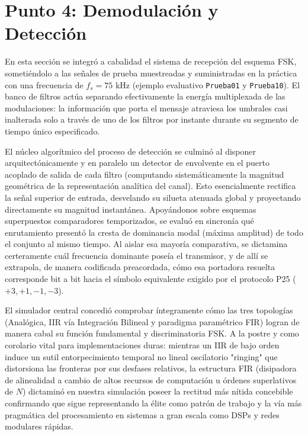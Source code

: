 \documentclass[9pt,a4paper,oneside]{rho-class/rho}
\begin{document}
\section{Punto 4: Demodulación y Detección}

    En esta sección se integró a cabalidad el sistema de recepción del esquema FSK, sometiéndolo a las señales de prueba muestreadas y suministradas en la práctica con una frecuencia de $f_s = 75$ kHz (ejemplo evaluativo \texttt{Prueba01} y \texttt{Prueba10}). El banco de filtros actúa separando efectivamente la energía multiplexada de las modulaciones: la información que porta el mensaje atraviesa los umbrales casi inalterada solo a través de uno de los filtros por instante durante su segmento de tiempo único especificado.
    
    El núcleo algorítmico del proceso de detección se culminó al disponer arquitectónicamente y en paralelo un detector de envolvente en el puerto acoplado de salida de cada filtro (computando sistemáticamente la magnitud geométrica de la representación analítica del canal). Esto esencialmente rectifica la señal superior de entrada, desvelando su silueta atenuada global y proyectando directamente su magnitud instantánea. Apoyándonos sobre esquemas superpuestos comparadores temporizados, se evaluó en sincronía qué enrutamiento presentó la cresta de dominancia modal (máxima amplitud) de todo el conjunto al mismo tiempo. Al aislar esa mayoría comparativa, se dictamina certeramente cuál frecuencia dominante poseía el transmisor, y de allí se extrapola, de manera codificada preacordada, cómo esa portadora resuelta corresponde bit a bit hacia el símbolo equivalente exigido por el protocolo P25 ($+3, +1, -1, -3$).
    
    El simulador central concedió comprobar íntegramente cómo las tres topologías (Analógica, IIR vía Integración Bilineal y paradigma paramétrico FIR) logran de manera cabal su función fundamental y discriminatoria FSK. A la postre y como corolario vital para implementaciones duras: mientras un IIR de bajo orden induce un sutil entorpecimiento temporal no lineal oscilatorio "ringing" que distorsiona las fronteras por sus desfases relativos, la estructura FIR (disipadora de alinealidad a cambio de altos recursos de computación u órdenes superlativos de $N$) dictaminó en nuestra simulación poseer la rectitud más nítida concebible confirmando que sigue representando la élite como patrón de trabajo y la vía más pragmática del procesamiento en sistemas a gran escala como DSPs y redes modulares rápidas.
    
\end{document}
